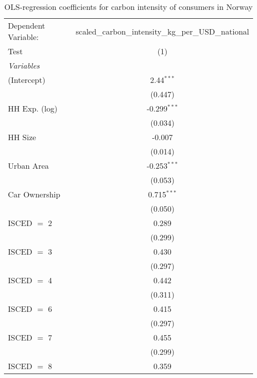 
\begin{table}[htbp!]
   \centering
   \small
   \begin{adjustbox}{width = 1\textwidth, max height = 0.95\textheight, center}
      \begin{threeparttable}[b]
         \caption{\label{tab:OLS_1_NOR} OLS-regression coefficients for carbon intensity of consumers in Norway}
         \begin{tabular}{lc}
            \tabularnewline \midrule \midrule
            Dependent Variable: & scaled\_carbon\_intensity\_kg\_per\_USD\_national\\        
            Test                & (1)\\  
            \midrule
            \emph{Variables}\\
            (Intercept)         & 2.44$^{***}$\\   
                                & (0.447)\\   
            HH Exp. (log)       & -0.299$^{***}$\\   
                                & (0.034)\\   
            HH Size             & -0.007\\   
                                & (0.014)\\   
            Urban Area          & -0.253$^{***}$\\   
                                & (0.053)\\   
            Car Ownership       & 0.715$^{***}$\\   
                                & (0.050)\\   
            ISCED $=$ 2         & 0.289\\   
                                & (0.299)\\   
            ISCED $=$ 3         & 0.430\\   
                                & (0.297)\\   
            ISCED $=$ 4         & 0.442\\   
                                & (0.311)\\   
            ISCED $=$ 6         & 0.415\\   
                                & (0.297)\\   
            ISCED $=$ 7         & 0.455\\   
                                & (0.299)\\   
            ISCED $=$ 8         & 0.359\\   

\end{tabular}
\end{threeparttable}
\end{adjustbox}
\end{table}
